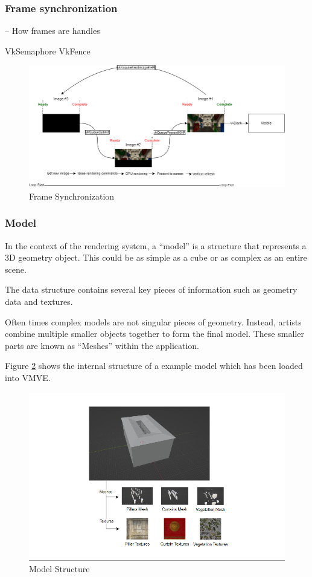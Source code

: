 \documentclass[11pt]{article}
\begin{document}
\subsubsection{Frame synchronization}
-- How frames are handles

VkSemaphore
VkFence

\begin{figure}[h!]
  \centering
  \includegraphics[width=\textwidth]{images/frame_sync.png}
  \caption{Frame Synchronization}
  \label{fig:frame_sync}
\end{figure}



\subsubsection{Model}
In the context of the rendering system, a ``model'' is a structure that represents
a 3D geometry object. This could be as simple as a cube or as complex as an
entire scene.

The data structure contains several key pieces of information such as geometry data
and textures. 

Often times complex models are not singular pieces of geometry. Instead, artists
combine multiple smaller objects together to form the final model. These smaller
parts are known as ``Meshes'' within the application.

Figure \ref{fig:model} shows the internal structure of a example model which has been
loaded into VMVE.
\begin{figure}[h!]
  \centering
  \includegraphics[width=\textwidth]{images/model.png}
  \caption{Model Structure}
  \label{fig:model}
\end{figure}
\end{document}

